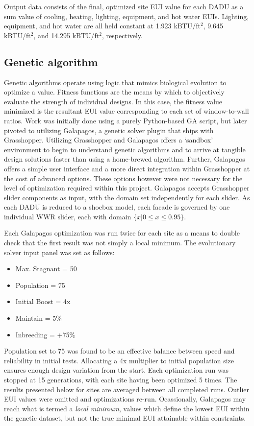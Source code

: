 \documentclass[sagev,times,Royal]{sagej}
\begin{document}
Output data consists of the final, optimized site EUI value for each DADU as a sum value of cooling, heating, lighting, equipment, and hot water EUIs. Lighting, equipment, and hot water are all held constant at 1.923 kBTU/ft$^2$, 9.645 kBTU/ft$^2$, and 14.295 kBTU/ft$^2$, respectively. 

\subsection{Genetic algorithm}
Genetic algorithms operate using logic that mimics biological evolution to optimize a value. Fitness functions are the means by which to objectively evaluate the strength of individual designs. In this case, the fitness value minimized is the resultant EUI value corresponding to each set of window-to-wall ratios. Work was initially done using a purely Python-based GA script, but later pivoted to utilizing Galapagos, a genetic solver plugin that ships with Grasshopper. Utilizing Grasshopper and Galapagos offers a ‘sandbox’ environment to begin to understand genetic algorithms and to arrive at tangible design solutions faster than using a home-brewed algorithm. Further, Galapagos offers a simple user interface and a more direct integration within Grasshopper at the cost of advanced options. These options however were not necessary for the level of optimization required within this project. Galapagos accepts Grasshopper slider components as input, with the domain set independently for each slider. As each DADU is reduced to a shoebox model, each facade is governed by one individual WWR slider, each with domain $\lbrace x \vert 0 \leq x \leq 0.95 \rbrace$. 

Each Galapagos optimization was run twice for each site as a means to double check that the first result was not simply a local minimum. The evolutionary solver input panel was set as follows: 

\begin{itemize}
	\item Max. Stagnant = 50
	\item Population = 75
	\item Initial Boost = 4x
	\item Maintain = 5\%
	\item Inbreeding = +75\%
\label{galapagos-settings}
\end{itemize}

Population set to 75 was found to be an effective balance between speed and reliability in initial tests. Allocating a 4x multiplier to initial population size ensures enough design variation from the start. Each optimization run was stopped at 15 generations, with each site having been optimized 5 times. The results presented below for sites are averaged between all completed runs. Outlier EUI values were omitted and optimizations re-run. Ocassionally, Galapagos may reach what is termed a \textit{local minimum}, values which define the lowest EUI within the genetic dataset, but not the true minimal EUI attainable within constraints.
\end{document}
